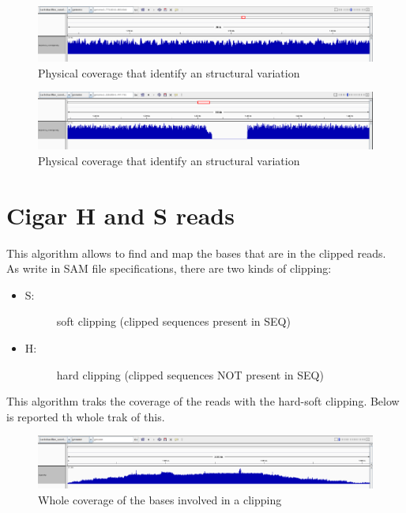  \begin{figure}[H]
				\centering
				\includegraphics[scale=0.6]{immagini/sequence_coverage_2.png}
				\caption{Physical coverage that identify an structural variation}\label{fig:10}
				\end{figure}
				
				
				
 \begin{figure}[H]
				\centering
				\includegraphics[scale=0.6]{immagini/sequence_coverage_3.png}
				\caption{Physical coverage that identify an structural variation}\label{fig:11}
				\end{figure}	
				
				

\section{Cigar H and S reads}
\label{sec:cigar}
This algorithm allows to find and map the bases that are in the clipped reads.\\
As write in SAM file specifications, there are two kinds of clipping:

\begin{itemize}
\item \begin{description}
		\item[S:] soft clipping (clipped sequences present in SEQ)
  \end{description}
\end{itemize}

\begin{itemize}
\item \begin{description}
		\item[H:] hard clipping (clipped sequences NOT present in SEQ)
  \end{description}
\end{itemize}


This algorithm traks the coverage of the reads with the hard-soft clipping. Below is reported th whole trak of this.
 \begin{figure}[H]
				\centering
				\includegraphics[scale=0.45]{immagini/cigar_coverage_1.png}
				\caption{Whole coverage of the bases involved in a clipping}\label{fig:15}
				\end{figure}	
				
